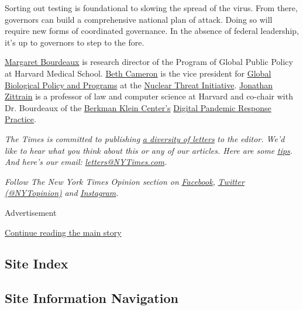 Sorting out testing is foundational to slowing the spread of the virus.
From there, governors can build a comprehensive national plan of attack.
Doing so will require new forms of coordinated governance. In the
absence of federal leadership, it's up to governors to step to the fore.

\href{https://www.hks.harvard.edu/about/margaret-bourdeaux}{Margaret
Bourdeaux} is research director of the Program of Global Public Policy
at Harvard Medical School.
\href{https://www.nti.org/about/leadership-and-staff/beth-cameron/}{Beth
Cameron} is the vice president for \href{http://covid-local.org/}{Global
Biological Policy and Programs} at the \href{http://nti.org/}{Nuclear
Threat Initiative}. \href{https://twitter.com/zittrain}{Jonathan
Zittrain} is a professor of law and computer science at Harvard and
co-chair with Dr. Bourdeaux of the
\href{https://cyber.harvard.edu/}{Berkman Klein Center's}
\href{https://cyber.harvard.edu/programs/bkc-policy-practice-digital-pandemic-response}{Digital
Pandemic Response Practice}.

\emph{The Times is committed to publishing}
\href{https://www.nytimes3xbfgragh.onion/2019/01/31/opinion/letters/letters-to-editor-new-york-times-women.html}{\emph{a
diversity of letters}} \emph{to the editor. We'd like to hear what you
think about this or any of our articles. Here are some}
\href{https://help.nytimes3xbfgragh.onion/hc/en-us/articles/115014925288-How-to-submit-a-letter-to-the-editor}{\emph{tips}}\emph{.
And here's our email:}
\href{mailto:letters@NYTimes.com}{\emph{letters@NYTimes.com}}\emph{.}

\emph{Follow The New York Times Opinion section on}
\href{https://www.facebookcorewwwi.onion/nytopinion}{\emph{Facebook}}\emph{,}
\href{http://twitter.com/NYTOpinion}{\emph{Twitter (@NYTopinion)}}
\emph{and}
\href{https://www.instagram.com/nytopinion/}{\emph{Instagram}}\emph{.}

Advertisement

\protect\hyperlink{after-bottom}{Continue reading the main story}

\hypertarget{site-index}{%
\subsection{Site Index}\label{site-index}}

\hypertarget{site-information-navigation}{%
\subsection{Site Information
Navigation}\label{site-information-navigation}}

